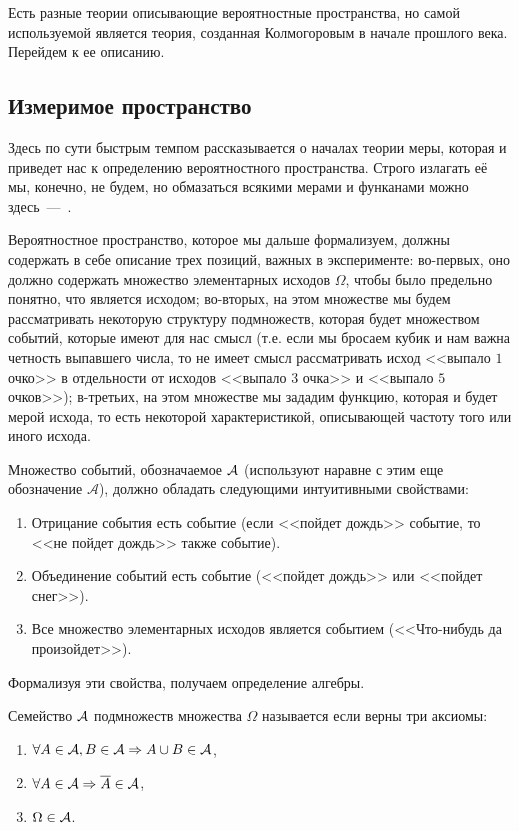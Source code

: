 \documentclass[../TV&MS.tex]{subfiles}
\begin{document}
Есть разные теории описывающие вероятностные пространства, но самой используемой является 
теория, созданная Колмогоровым в начале прошлого века. Перейдем к ее описанию.

\subsection{Измеримое пространство}
	
\qquad Здесь по сути быстрым темпом рассказывается о началах теории меры,
которая и приведет нас к определению вероятностного пространства. Строго излагать её мы, конечно, не будем, но обмазаться всякими мерами и функанами можно здесь~---~\cite{Gusev}.

Вероятностное пространство, которое мы дальше формализуем, должны 
содержать в себе описание трех позиций, важных в эксперименте: 
во-первых, оно должно содержать множество элементарных исходов $\Omega$,
чтобы было предельно понятно, что является исходом; во-вторых,
на этом множестве мы будем рассматривать некоторую структуру подмножеств,
которая будет множеством событий, которые имеют для нас смысл (т.е.
если мы бросаем кубик и нам важна четность выпавшего числа, то не имеет
смысл рассматривать исход <<выпало $1$ очко>> в отдельности от исходов 
<<выпало $3$ очка>> и <<выпало $5$ очков>>); в-третьих, на этом множестве мы 
зададим функцию, которая и будет мерой исхода, то есть некоторой 
характеристикой, описывающей частоту того или иного исхода.

Множество событий, обозначаемое $\mathcal{A}$ (используют наравне с этим еще обозначение 
$\mathscr{A}$), должно обладать следующими интуитивными свойствами:
\begin{enumerate}
	\item Отрицание события есть событие (если <<пойдет дождь>> событие, 
	то <<не пойдет дождь>> также событие).
	\item Объединение событий есть событие (<<пойдет дождь>> или <<пойдет снег>>).
	\item Все множество элементарных исходов является событием (<<Что-нибудь да произойдет>>).
\end{enumerate}

Формализуя эти свойства, получаем определение алгебры.
\begin{Def}
	Семейство $\mathcal{A}$ подмножеств множества $\Omega$  называется  если 
	верны три аксиомы:
\begin{enumerate}[label=(\roman*)]
	\item $\forall A \in \mathcal{A}, B\in \mathcal{A} \Rightarrow A \cup B \in \mathcal{A}$,
	\item $\forall A \in \mathcal{A} \Rightarrow \overline{A} \in \mathcal{A}$,
	\item $\Omega \in \mathcal{A}$.
\end{enumerate}\smallskip
\end{Def}
\end{document}
